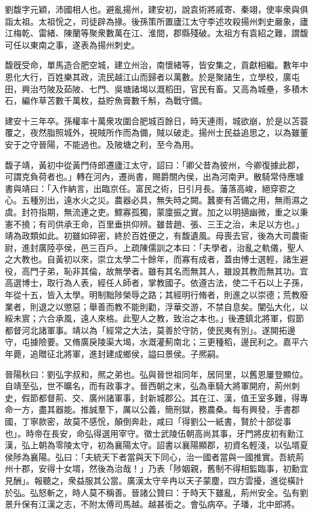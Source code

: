 
\begin{pinyinscope}
劉馥字元穎，沛國相人也。避亂揚州，建安初，說袁術將戚寄、秦翊，使率衆與俱詣太祖。太祖恱之，司徒辟為掾。後孫策所置廬江太守李述攻殺揚州刺史嚴象，廬江梅乾、雷緒、陳蘭等聚衆數萬在江、淮間，郡縣殘破。太祖方有袁紹之難，謂馥可任以東南之事，遂表為揚州刺史。

馥旣受命，單馬造合肥空城，建立州治，南懷緒等，皆安集之，貢獻相繼。數年中恩化大行，百姓樂其政，流民越江山而歸者以萬數。於是聚諸生，立學校，廣屯田，興治芍陂及茹陂、七門、吳塘諸堨以溉稻田，官民有畜。又高為城壘，多積木石，編作草苫數千萬枚，益貯魚膏數千斛，為戰守備。

建安十三年卒。孫權率十萬衆攻圍合肥城百餘日，時天連雨，城欲崩，於是以苫蓑覆之，夜然脂照城外，視賊所作而為備，賊以破走。揚州士民益追思之，以為雖董安于之守晉陽，不能過也。及陂塘之利，至今為用。

馥子靖，黃初中從黃門侍郎遷廬江太守，詔曰：「卿父昔為彼州，今卿復據此郡，可謂克負荷者也。」轉在河內，遷尚書，賜爵關內侯，出為河南尹。散騎常侍應璩書與靖曰：「入作納言，出臨京任。富民之術，日引月長。藩落高峻，絕穿窬之心。五種別出，遠水火之災。農器必具，無失時之闕。蠶麥有苫備之用，無雨濕之虞。封符指期，無流連之吏。鰥寡孤獨，蒙廩振之實。加之以明擿幽微，重之以秉憲不撓；有司供承王命，百里垂拱仰辨。雖昔趙、張、三王之治，未足以方也。」靖為政類如此。初雖如碎密，終於百姓便之，有馥遺風。母喪去官，後為大司農衞尉，進封廣陸亭侯，邑三百戶。上疏陳儒訓之本曰：「夫學者，治亂之軌儀，聖人之大教也。自黃初以來，崇立太學二十餘年，而寡有成者，蓋由愽士選輕，諸生避役，高門子弟，恥非其倫，故無學者。雖有其名而無其人，雖設其教而無其功。宜高選博士，取行為人表，經任人師者，掌教國子。依遵古法，使二千石以上子孫，年從十五，皆入太學。明制黜陟榮辱之路；其經明行脩者，則進之以崇德；荒教廢業者，則退之以懲惡；舉善而教不能則勸，浮華交游，不禁自息矣。闡弘大化，以綏未賔；六合承風，遠人來格。此聖人之教，致治之本也。」後遷鎮北將軍，假節都督河北諸軍事。靖以為「經常之大法，莫善於守防，使民夷有別」。遂開拓邊守，屯據險要。又脩廣戾陵渠大堨，水溉灌薊南北；三更種稻，邊民利之。嘉平六年薨，追贈征北將軍，進封建成鄉侯，謚曰景侯。子熈嗣。

晉陽秋曰：劉弘字叔和，熈之弟也。弘與晉世祖同年，居同里，以舊恩屢登顯位。自靖至弘，世不曠名，而有政事才。晉西朝之末，弘為車騎大將軍開府，荊州刺史，假節都督荊、交、廣州諸軍事，封新城郡公。其在江、漢，值王室多難，得專命一方，盡其器能。推誠羣下，厲以公義，簡刑獄，務農桑。每有興發，手書郡國，丁寧款密，故莫不感恱，顛倒奔赴，咸曰「得劉公一紙書，賢於十部從事也」。時帝在長安，命弘得選用宰守。徵士武陵伍朝高尚其事，牙門將皮初有勳江漢，弘上朝為零陵太守，初為襄陽太守。詔書以襄陽顯郡，初資名輕淺，以弘壻夏侯陟為襄陽。弘曰：「夫統天下者當與天下同心，治一國者當與一國推實。吾統荊州十郡，安得十女壻，然後為治哉！」乃表「陟姻親，舊制不得相監臨事，初勳宜見酬」。報聽之，衆益服其公當。廣漢太守辛冉以天子蒙塵，四方雲擾，進從橫計於弘。弘怒斬之，時人莫不稱善。晉諸公贊曰：于時天下雖亂，荊州安全。弘有劉景升保有江漢之志，不附太傅司馬越。越甚銜之。會弘病卒。子璠，北中郎將。


\end{pinyinscope}